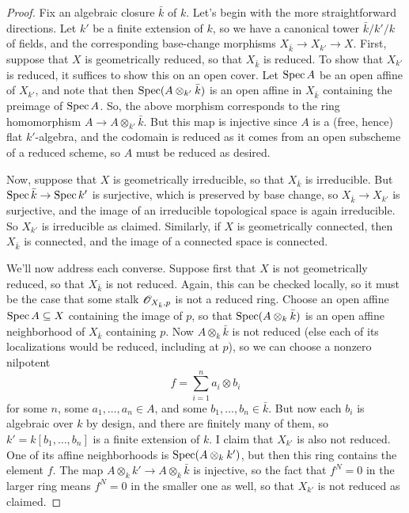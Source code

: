 \begin{proof}
	Fix an algebraic closure $\bar{k}$ of $k$. Let's begin with the more straightforward directions. Let $k'$ be a finite extension of $k$, so we have a canonical tower $\bar{k}/k'/k$ of fields, and the corresponding base-change morphisms $X_{\bar{k}} \to X_{k'} \to X$. First, suppose that $X$ is geometrically reduced, so that $X_{\bar{k}}$ is reduced. To show that $X_{k'}$ is reduced, it suffices to show this on an open cover. Let $\operatorname{Spec} A$ be an open affine of $X_{k'}$, and note that then $\operatorname{Spec}(A \otimes_{k'} \bar{k})$ is an open affine in $X_{\bar{k}}$ containing the preimage of $\operatorname{Spec} A$. So, the above morphism corresponds to the ring homomorphism $A \to A \otimes_{k'} \bar{k}$. But this map is injective since $A$ is a (free, hence) flat $k'$-algebra, and the codomain is reduced as it comes from an open subscheme of a reduced scheme, so $A$ must be reduced as desired.
	
	Now, suppose that $X$ is geometrically irreducible, so that $X_{\bar{k}}$ is irreducible. But $\operatorname{Spec}\bar{k} \to \operatorname{Spec} k'$ is surjective, which is preserved by base change, so $X_{\bar{k}} \to X_{k'}$ is surjective, and the image of an irreducible topological space is again irreducible. So $X_{k'}$ is irreducible as claimed. Similarly, if $X$ is geometrically connected, then $X_{\bar{k}}$ is connected, and the image of a connected space is connected.
	
	We'll now address each converse. Suppose first that $X$ is not geometrically reduced, so that $X_{\bar{k}}$ is not reduced. Again, this can be checked locally, so it must be the case that some stalk $\mathscr{O}_{X_{\bar{k}},p}$ is not a reduced ring. Choose an open affine $\operatorname{Spec} A \subseteq X$ containing the image of $p$, so that $\operatorname{Spec}(A \otimes_k \bar{k})$ is an open affine neighborhood of $X_{\bar{k}}$ containing $p$. Now $A \otimes_k \bar{k}$ is not reduced (else each of its localizations would be reduced, including at $p$), so we can choose a nonzero nilpotent
	\[ f = \sum_{i=1}^n a_i \otimes b_i \]
	for some $n$, some $a_1,\ldots,a_n \in A$, and some $b_1,\ldots,b_n \in \bar{k}$. But now each $b_i$ is algebraic over $k$ by design, and there are finitely many of them, so $k' = k[b_1,\ldots,b_n]$ is a finite extension of $k$. I claim that $X_{k'}$ is also not reduced. One of its affine neighborhoods is $\operatorname{Spec}(A \otimes_k k')$, but then this ring contains the element $f$. The map $A \otimes_k k' \to A \otimes_k \bar{k}$ is injective, so the fact that $f^N = 0$ in the larger ring means $f^N=0$ in the smaller one as well, so that $X_{k'}$ is not reduced as claimed.
	

\end{proof}
